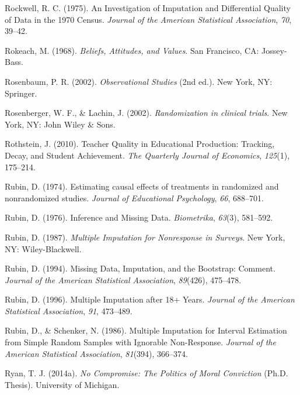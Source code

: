 \documentclass[12pt,econ]{sources/authesis}
\begin{document}
\leavevmode\hypertarget{ref-rockwell_1975_investigation}{}%
Rockwell, R. C. (1975). An Investigation of Imputation and Differential Quality of Data in the 1970 Census. \emph{Journal of the American Statistical Association}, \emph{70}, 39--42.

\leavevmode\hypertarget{ref-rokeach_1968_beliefs}{}%
Rokeach, M. (1968). \emph{Beliefs, Attitudes, and Values}. San Francisco, CA: Jossey-Bass.

\leavevmode\hypertarget{ref-rosenbaum_2002_observational}{}%
Rosenbaum, P. R. (2002). \emph{Observational Studies} (2nd ed.). New York, NY: Springer.

\leavevmode\hypertarget{ref-rosenberger_2002_randomization}{}%
Rosenberger, W. F., \& Lachin, J. (2002). \emph{Randomization in clinical trials}. New York, NY: John Wiley \& Sons.

\leavevmode\hypertarget{ref-rothstein_2010_teacher}{}%
Rothstein, J. (2010). Teacher Quality in Educational Production: Tracking, Decay, and Student Achievement. \emph{The Quarterly Journal of Economics}, \emph{125}(1), 175--214.

\leavevmode\hypertarget{ref-rubin_1974_estimating}{}%
Rubin, D. (1974). Estimating causal effects of treatments in randomized and nonrandomized studies. \emph{Journal of Educational Psychology}, \emph{66}, 688--701.

\leavevmode\hypertarget{ref-rubin_1976_inference}{}%
Rubin, D. (1976). Inference and Missing Data. \emph{Biometrika}, \emph{63}(3), 581--592.

\leavevmode\hypertarget{ref-rubin_1987_multiple}{}%
Rubin, D. (1987). \emph{Multiple Imputation for Nonresponse in Surveys}. New York, NY: Wiley-Blackwell.

\leavevmode\hypertarget{ref-rubin_1994_missing}{}%
Rubin, D. (1994). Missing Data, Imputation, and the Bootstrap: Comment. \emph{Journal of the American Statistical Association}, \emph{89}(426), 475--478.

\leavevmode\hypertarget{ref-rubin_1996_multiple}{}%
Rubin, D. (1996). Multiple Imputation after 18+ Years. \emph{Journal of the American Statistical Association}, \emph{91}, 473--489.

\leavevmode\hypertarget{ref-rubin_1986_multiple}{}%
Rubin, D., \& Schenker, N. (1986). Multiple Imputation for Interval Estimation from Simple Random Samples with Ignorable Non-Response. \emph{Journal of the American Statistical Association}, \emph{81}(394), 366--374.

\leavevmode\hypertarget{ref-ryan_no_2014}{}%
Ryan, T. J. (2014a). \emph{No Compromise: The Politics of Moral Conviction} (Ph.D. Thesis). University of Michigan.
\end{document}
